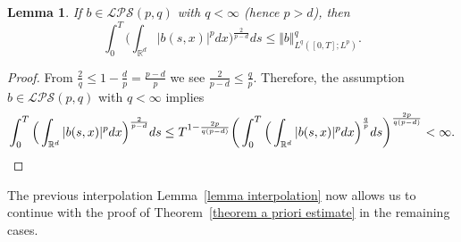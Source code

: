 \documentclass[a4paper,10pt]{article}
\newtheorem{lemma}[theorem]{Lemma}
\newcommand\1{\mathbbm{1}}
\numberwithin{equation}{section}
\begin{document}
\begin{lemma}
If $b\in\mathcal{LPS}(p,q)$ with $q<\infty$ \textup{(}hence $p>d$\textup{)}, then
\begin{equation}
\int_{0}^{T} \Big( \int_{\mathbb{R}^{d}} \vert b(s,x) \vert
^{p}dx \Big)^{\frac{2}{p-d}}ds\leq \Vert b \Vert _{L^{q}([0,T];L^{p})  }^{q}. \label{bound on b} 
\end{equation}
\end{lemma}

\begin{proof}
From $\frac{2}{q}\leq1-\frac{d}{p}=\frac{p-d}{p}$ we see $\frac{2} 
{p-d}\leq\frac{q}{p}$. Therefore, the assumption $b\in\mathcal{LPS}(p,q)$ with $q<\infty$ implies
\begin{equation*}
\int_{0}^{T} \Big(\int_{\mathbb{R}^{d}} \vert b(s,x)  \vert^{p}dx \Big)^{\frac{2}{p-d}}ds \leq T^{1-\frac{2p}{q(p-d)}} \bigg( \int 
_{0}^{T} \Big( \int_{\mathbb{R}^{d}} \vert b(s,x) \vert^{p} dx \Big)^{\frac{q}{p}}ds \bigg)^{\frac{2p}{q(p-d)  }}<\infty . \qedhere
\end{equation*}
\end{proof}

The previous interpolation Lemma~\ref{lemma interpolation} now allows us to continue with the proof of Theorem~\ref{theorem a priori estimate} in the remaining cases.
\end{document}

